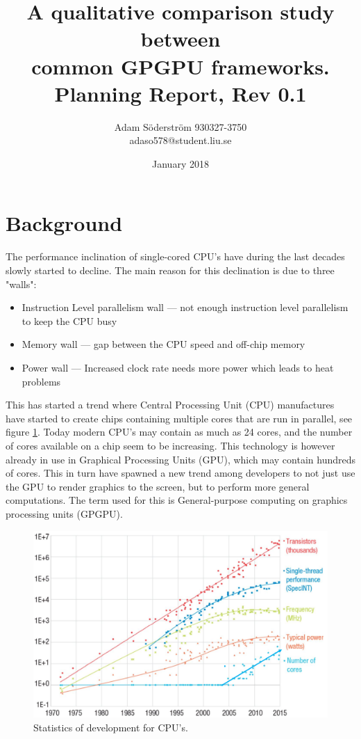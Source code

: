 \documentclass{article}
\title{%
  A qualitative comparison study between \\  
  common GPGPU frameworks. \\
  \large Planning Report, Rev 0.1 \\
}
\author{
    Adam Söderström 930327-3750 \\
    adaso578@student.liu.se 
}
\date{January 2018}
\begin{document}
\maketitle

\section{Background}
The performance inclination of single-cored CPU's have during the last decades slowly started to decline. The main reason for this declination is due to three "walls":

\begin{itemize}
    \item Instruction Level parallelism wall --- not enough instruction level parallelism to keep the CPU busy
    \item Memory wall --- gap between the CPU speed and off-chip memory
    \item Power wall --- Increased clock rate needs more power which leads to heat problems
\end{itemize}

\noindent This has started a trend where Central Processing Unit (CPU) manufactures have started to create chips containing multiple cores that are run in parallel, see figure \ref{fig:cpuStats}. Today modern CPU's may contain as much as 24 cores, and the number of cores available on a chip seem to be increasing. This technology is however already in use in Graphical Processing Units (GPU), which may contain hundreds of cores. This in turn have spawned a new trend among developers to not just use the GPU to render graphics to the screen, but to perform more general computations. The term used for this is General-purpose computing on graphics processing units (GPGPU).

\begin{figure}[!h]
    \centering
    \includegraphics[width=12cm]{Figs/CPUStats.png}
    \caption{Statistics of development for CPU's. \cite{CPUStats}}
    \label{fig:cpuStats}
\end{figure}
\end{document}

